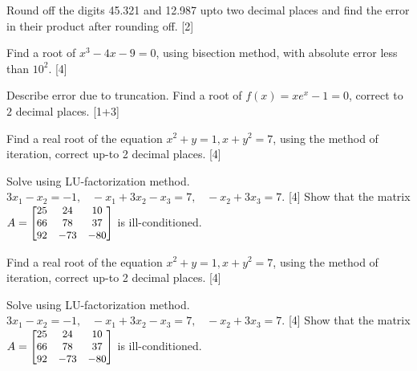 \documentclass[12pt]{exam}
\begin{document}
\begin{questions}

\question Round off the digits 45.321 and 12.987 upto two decimal places and find the error in their product after rounding off. [2]

\question Find a root of $x^3-4x-9=0$, using bisection method, with absolute error less than $10^2$. [4]

\question Describe error due to truncation. Find a root of \(f(x)=xe^x-1=0\), correct to \(2\) decimal places. [1+3]

  \clearpage

\vspace{4cm}
\question Find a real root of the equation $x^2+y =1, x+y^2=7$, using the method of iteration, correct up-to 2 decimal places. [4]

\question Solve using LU-factorization method. $3x_1 - x_2 = -1, \;\;\; -x_1+3x_2-x_3 = 7, \;\;\; -x_2+3x_3 =7$. [4]
\vskip -5mm
\question Show that the matrix $ \small A=   \begin{bmatrix}
    25  & 24 & 10 \\
    66 & 78 & 37 \\
    92 & -73 & -80
  \end{bmatrix}
  $ is ill-conditioned.
\vspace{12cm}

\question Find a real root of the equation $x^2+y =1, x+y^2=7$, using the method of iteration, correct up-to 2 decimal places. [4]

\question Solve using LU-factorization method. $3x_1 - x_2 = -1, \;\;\; -x_1+3x_2-x_3 = 7, \;\;\; -x_2+3x_3 =7$. [4]
\vskip -5mm
\question Show that the matrix $ \small A=   \begin{bmatrix}
    25  & 24 & 10 \\
    66 & 78 & 37 \\
    92 & -73 & -80
  \end{bmatrix}
  $ is ill-conditioned.
\end{questions}
\end{document}
